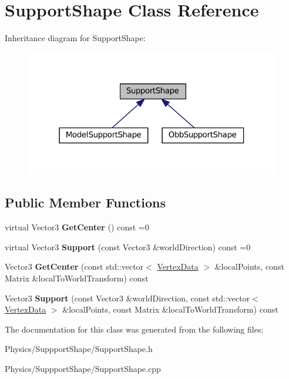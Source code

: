 \hypertarget{classSupportShape}{}\section{Support\+Shape Class Reference}
\label{classSupportShape}


Inheritance diagram for Support\+Shape\+:\nopagebreak
\begin{figure}[H]
\begin{center}
\leavevmode
\includegraphics[width=316pt]{classSupportShape__inherit__graph}
\end{center}
\end{figure}
\subsection*{Public Member Functions}
\begin{DoxyCompactItemize}
\item 
\mbox{\label{classSupportShape_ac81f62a38aeadbf03d637e5134479467}} 
virtual Vector3 {\bfseries Get\+Center} () const =0
\item 
\mbox{\label{classSupportShape_ad6aca93d79a36c7db3a449a4364a2c1e}} 
virtual Vector3 {\bfseries Support} (const Vector3 \&world\+Direction) const =0
\item 
\mbox{\label{classSupportShape_a2cda78c3f08e49269c830d6ab0595244}} 
Vector3 {\bfseries Get\+Center} (const std\+::vector$<$ \hyperlink{structVertexData}{Vertex\+Data} $>$ \&local\+Points, const Matrix \&local\+To\+World\+Transform) const
\item 
\mbox{\label{classSupportShape_a105572c175fd14661261a7d189d409a2}} 
Vector3 {\bfseries Support} (const Vector3 \&world\+Direction, const std\+::vector$<$ \hyperlink{structVertexData}{Vertex\+Data} $>$ \&local\+Points, const Matrix \&local\+To\+World\+Transform) const
\end{DoxyCompactItemize}


The documentation for this class was generated from the following files\+:\begin{DoxyCompactItemize}
\item 
Physics/\+Suppport\+Shape/Support\+Shape.\+h\item 
Physics/\+Suppport\+Shape/Support\+Shape.\+cpp\end{DoxyCompactItemize}
